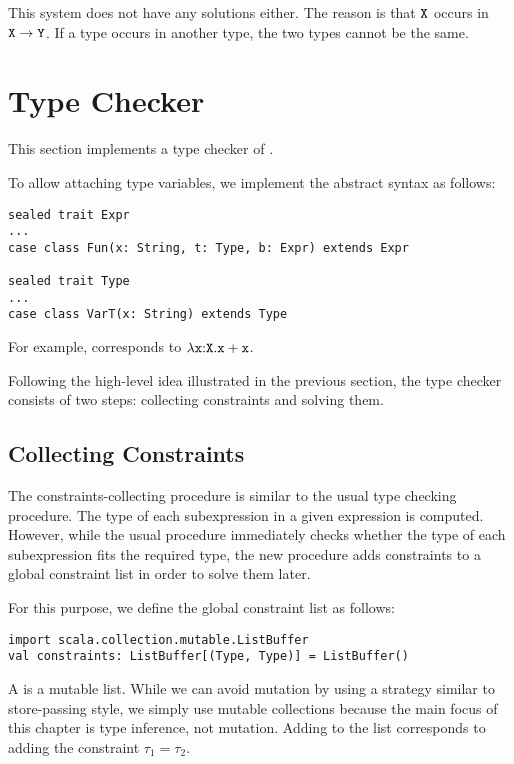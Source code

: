 This system does not have any solutions either. The reason is that $\texttt{X}$ occurs
in $\texttt{X}\rightarrow\texttt{Y}$. If a type occurs in another type, the two types cannot
be the same.

\section{Type Checker}

This section implements a type checker of \lang.

To allow attaching type variables, we implement the abstract syntax as follows:

\begin{verbatim}
sealed trait Expr
...
case class Fun(x: String, t: Type, b: Expr) extends Expr

sealed trait Type
...
case class VarT(x: String) extends Type
\end{verbatim}

For example,  corresponds to
$\lambda\texttt{x}{:}\texttt{X}.\texttt{x}+\texttt{x}$.

Following the high-level idea illustrated in the previous section, the type
checker consists of two steps: collecting constraints and solving them.

\subsection{Collecting Constraints}

The constraints-collecting procedure is similar to the usual type checking
procedure. The type of each subexpression in a given expression is computed.
However, while the usual procedure immediately checks whether the type of each
subexpression fits the required type, the new procedure adds constraints to a
global constraint list in order to solve them later.

For this purpose, we define the global constraint list as follows:

\begin{verbatim}
import scala.collection.mutable.ListBuffer
val constraints: ListBuffer[(Type, Type)] = ListBuffer()
\end{verbatim}

A  is a mutable list. While we can avoid mutation by using a
strategy similar to store-passing style, we simply use mutable collections
because the main focus of this chapter is type inference, not mutation. Adding
 to the list corresponds to adding the constraint
$\tau_1=\tau_2$.

